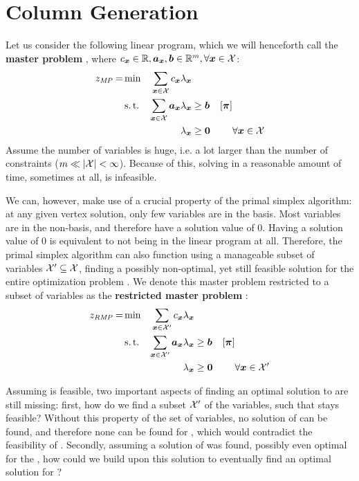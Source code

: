 \section{Column Generation}\label{sec:cg_bp_cg}
Let us consider the following linear program, which we will henceforth call the \textbf{master problem} \MP{}, where $c_{\bm{x}} \in \mathbb{R}, {\bm{a}}_{\bm{x}}, {\bm{b}} \in \mathbb{R}^m, \forall {\bm{x}} \in \mathcal{X}$:
\begin{equation}
\begin{aligned}
z_{\textit{MP}}{} = &\min & \sum_{{\bm{x}} \in \mathcal{X}} c_{\bm{x}} \lambda_{\bm{x}} & & & \\
&\operatorname{s.t.} & \sum_{{\bm{x}} \in \mathcal{X}} {\bm{a}}_{\bm{x}} \lambda_{\bm{x}} & \geq {\bm{b}} & \left[{\bm{\pi}}\right] & \\
&& \lambda_{\bm{x}} & \geq {\bm{0}} & & \forall {\bm{x}} \in \mathcal{X}
\end{aligned}
\end{equation}
Assume the number of variables is huge, i.e. a lot larger than the number of constraints ($m \ll \lvert\mathcal{X}\rvert < \infty$). Because of this, solving \MP{} in a reasonable amount of time, sometimes at all, is infeasible.

We can, however, make use of a crucial property of the primal simplex algorithm: at any given vertex solution, only few variables are in the basis. Most variables are in the non-basis, and therefore have a solution value of $0$. Having a solution value of $0$ is equivalent to not being in the linear program at all. Therefore, the primal simplex algorithm can also function using a manageable subset of variables $\mathcal{X}' \subseteq \mathcal{X}$, finding a possibly non-optimal, yet still feasible solution for the entire optimization problem \MP{}. We denote this master problem restricted to a subset of variables as the \textbf{restricted master problem} \RMP{}:
\begin{equation}
\begin{aligned}
z_{\textit{RMP}}{} = &\min & \sum_{{\bm{x}} \in \mathcal{X}'} c_{\bm{x}} \lambda_{\bm{x}} & & & \\
&\operatorname{s.t.} & \sum_{{\bm{x}} \in \mathcal{X}'} {\bm{a}}_{\bm{x}} \lambda_{\bm{x}} & \geq {\bm{b}} & \left[{\bm{\pi}}\right] & \\
&& \lambda_{\bm{x}} & \geq {\bm{0}} & & \forall {\bm{x}} \in \mathcal{X}'
\end{aligned}
\end{equation}

Assuming \MP{} is feasible, two important aspects of finding an optimal solution to \MP{} are still missing: first, how do we find a subset $\mathcal{X}'$ of the variables, such that \RMP{} stays feasible? Without this property of the set of variables, no solution of \RMP{} can be found, and therefore none can be found for \MP{}, which would contradict the feasibility of \MP{}. Secondly, assuming a solution of \RMP{} was found, possibly even optimal for the \RMP{}, how could we build upon this solution to eventually find an optimal solution for \MP{}?

